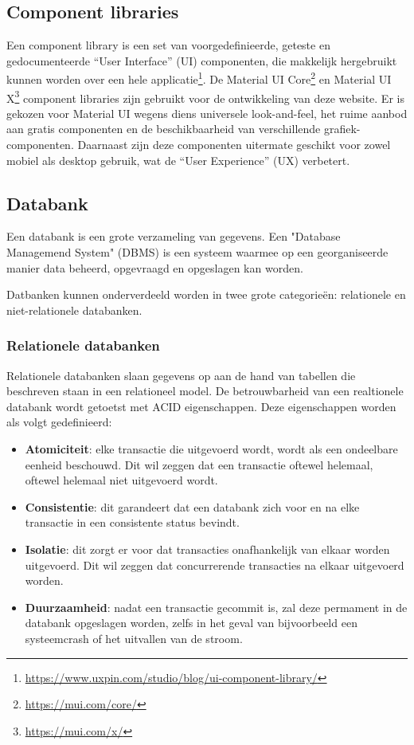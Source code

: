 \subsection{Component libraries}
Een component library is een set van voorgedefinieerde, geteste en gedocumenteerde ``User Interface'' (UI) componenten, die makkelijk hergebruikt kunnen worden over een hele applicatie\footnote{\href{https://www.uxpin.com/studio/blog/ui-component-library/}{https://www.uxpin.com/studio/blog/ui-component-library/}}.
De Material UI Core\footnote{\href{https://mui.com/core/}{https://mui.com/core/}} en Material UI X\footnote{\href{https://mui.com/x/}{https://mui.com/x/}} component libraries zijn gebruikt voor de ontwikkeling van deze website. Er is gekozen voor Material UI wegens diens universele look-and-feel, het ruime aanbod aan gratis componenten en de beschikbaarheid van verschillende grafiek-componenten. Daarnaast zijn deze componenten uitermate geschikt voor zowel mobiel als desktop gebruik, wat de ``User Experience'' (UX) verbetert.

\subsection{Databank}

Een databank is een grote verzameling van gegevens. Een "Database Managemend System" (DBMS) is een systeem waarmee op een georganiseerde manier data beheerd, opgevraagd en opgeslagen kan worden. 

Datbanken kunnen onderverdeeld worden in twee grote categorieën: relationele en niet-relationele databanken.

\subsubsection{Relationele databanken}
Relationele databanken slaan gegevens op aan de hand van tabellen die beschreven staan in een relationeel model. 
De betrouwbarheid van een  realtionele databank wordt getoetst met ACID eigenschappen. Deze eigenschappen worden als volgt gedefinieerd:

\begin{itemize}
    \item \textbf{Atomiciteit}: elke transactie die uitgevoerd wordt, wordt als een ondeelbare eenheid beschouwd. Dit wil zeggen dat een transactie oftewel helemaal, oftewel helemaal niet uitgevoerd wordt.
    \item \textbf{Consistentie}: dit garandeert dat een databank zich voor en na elke transactie in een consistente status bevindt.
    \item \textbf{Isolatie}: dit zorgt er voor dat transacties onafhankelijk van elkaar worden uitgevoerd. Dit wil zeggen dat concurrerende transacties na elkaar uitgevoerd worden.
    \item \textbf{Duurzaamheid}: nadat een transactie gecommit is, zal deze permament in de databank opgeslagen worden, zelfs in het geval van bijvoorbeeld een systeemcrash of het uitvallen van de stroom. 
\end{itemize}

